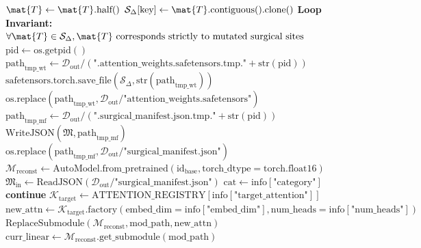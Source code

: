 \begin{algorithm}[H]
\begin{algorithmic}[1]
            \STATE $\mat{T} \leftarrow \mat{T}.\text{half}()$ 
        \ENDIF
        \STATE $\mathcal{S}_{\Delta}[\text{key}] \leftarrow \mat{T}.\text{contiguous}().\text{clone}()$
    \ENDIF
    \STATE \textbf{Loop Invariant:} $\forall \mat{T} \in \mathcal{S}_{\Delta}, \mat{T} \text{ corresponds strictly to mutated surgical sites}$
\ENDFOR
\STATE {}
\STATE $\text{pid} \leftarrow \text{os.getpid}()$
\STATE $\text{path}_{\text{tmp\_wt}} \leftarrow \mathcal{D}_{\text{out}} / (\text{".attention\_weights.safetensors.tmp."} + \text{str}(\text{pid}))$
\STATE $\text{safetensors.torch.save\_file}(\mathcal{S}_{\Delta}, \text{str}(\text{path}_{\text{tmp\_wt}}))$
\STATE $\text{os.replace}(\text{path}_{\text{tmp\_wt}}, \mathcal{D}_{\text{out}} / \text{"attention\_weights.safetensors"})$ 
\STATE $\text{path}_{\text{tmp\_mf}} \leftarrow \mathcal{D}_{\text{out}} / (\text{".surgical\_manifest.json.tmp."} + \text{str}(\text{pid}))$
\STATE $\text{WriteJSON}(\mathfrak{M}, \text{path}_{\text{tmp\_mf}})$
\STATE $\text{os.replace}(\text{path}_{\text{tmp\_mf}}, \mathcal{D}_{\text{out}} / \text{"surgical\_manifest.json"})$
\STATE {}
\STATE $\mathcal{M}_{\text{reconst}} \leftarrow \text{AutoModel.from\_pretrained}(\text{id}_{\text{base}}, \text{torch\_dtype}=\text{torch.float16})$
\STATE $\mathfrak{M}_{\text{in}} \leftarrow \text{ReadJSON}(\mathcal{D}_{\text{out}} / \text{"surgical\_manifest.json"})$
    \STATE $\text{cat} \leftarrow \text{info}[\text{"category"}]$
        \STATE \textbf{continue} 
        \STATE $\mathcal{K}_{\text{target}} \leftarrow \text{ATTENTION\_REGISTRY}[\text{info}[\text{"target\_attention"}]]$
        \STATE $\text{new\_attn} \leftarrow \mathcal{K}_{\text{target}}.\text{factory}(\text{embed\_dim}=\text{info}[\text{"embed\_dim"}], \text{num\_heads}=\text{info}[\text{"num\_heads"}])$
        \STATE $\text{ReplaceSubmodule}(\mathcal{M}_{\text{reconst}}, \text{mod\_path}, \text{new\_attn})$
        \STATE $\text{curr\_linear} \leftarrow \mathcal{M}_{\text{reconst}}.\text{get\_submodule}(\text{mod\_path})$

\end{algorithmic}
\end{algorithm}
